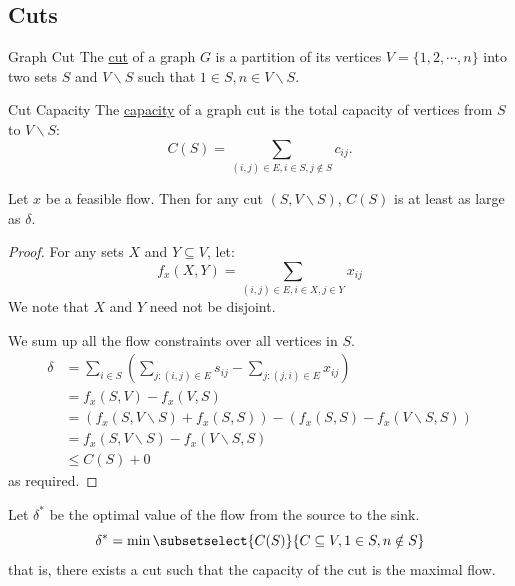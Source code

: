 \documentclass[../Main.tex]{subfiles}
\begin{document}
\subsection{Cuts}
\begin{definition}{Graph Cut}
    The \underline{cut} of a graph $G$ is a partition of its vertices $V = \{1, 2, \cdots, n\}$ into two sets $S$ and $V \backslash S$ such that $1 \in S, n \in V \backslash S$.
\end{definition}
\begin{definition}{Cut Capacity}
    The \underline{capacity} of a graph cut is the total capacity of vertices from $S$ to $V \backslash S$:
    \begin{equation*}
        C(S) = \sum_{(i, j) \in E, i \in S, j \notin S} c_{ij}.
    \end{equation*}
\end{definition}
\begin{theorem}
    Let $x$ be a feasible flow. Then for any cut $(S, V \backslash S)$, $C(S)$ is at least as large as $\delta$.
\label{thmMaxFlowLessMinCut}
\end{theorem}
\begin{proof}
    For any sets $X$ and $Y \subseteq V$, let:
    \begin{equation*}
        f_x(X, Y) = \sum_{(i, j) \in E, i \in X, j \in Y} x_{ij}
    \end{equation*}
    We note that $X$ and $Y$ need not be disjoint.

    We sum up all the flow constraints over all vertices in $S$.
    \begin{align*}
        \delta &= \sum_{i \in S} \left(\sum_{j : (i, j) \in E} s_{ij} - \sum_{j : (j, i) \in E} x_{ij}\right) \\
        &= f_x(S, V) - f_x(V, S) \\
        &= \left(f_x(S, V \backslash S) + f_x(S, S)\right) - \left(f_x(S, S) - f_x(V \backslash S, S)\right) \\
        &= f_x(S, V \backslash S) - f_x(V \backslash S, S) \\
        &\leq C(S) + 0
    \end{align*}
    as required.
\end{proof}
\begin{theorem}
    Let $\delta^*$ be the optimal value of the flow from the source to the sink.
    \begin{equation*}
        \delta^* = \min \subsetselect{C(S)}{C \subseteq V, 1 \in S, n \notin S}
    \end{equation*}
    that is, there exists a cut such that the capacity of the cut is the maximal flow.
\label{thmMaxFlowMinCut}
\end{theorem}
\end{document}

